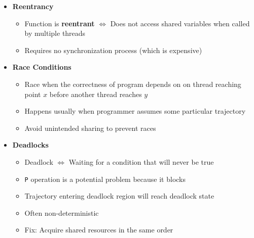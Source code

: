 \documentclass[12pt]{article}
\begin{document}
{\begin{itemize}
\begin{itemize}
\begin{enumerate}
\begin{itemize}
			\end{itemize}
			\item Functions that call other unsafe functions
			\begin{itemize}
				\item Just don't call them
			\end{itemize}
		\end{enumerate}
	\end{itemize}	
	\item \textbf{Reentrancy}
	\begin{itemize}
		\item Function is \textbf{reentrant} $\iff$ Does not access shared variables when called by multiple threads
		\item Requires no synchronization process (which is expensive)
	\end{itemize}
	\item \textbf{Race Conditions}
	\begin{itemize}
		\item Race when the correctness of program depends on on thread reaching point $ x $ before another thread reaches $ y $
		\item Happens usually when programmer assumes some particular trajectory
		\item Avoid unintended sharing to prevent races
	\end{itemize}
	\item \textbf{Deadlocks}
	\begin{itemize}
		\item Deadlock $\iff$ Waiting for a condition that will never be true
		\item \texttt{P} operation is a potential problem because it blocks
		\item Trajectory entering deadlock region will reach deadlock state
		\item Often non-deterministic
		\item Fix: Acquire shared resources in the same order
	\end{itemize}
\end{itemize}

}
\end{document}
